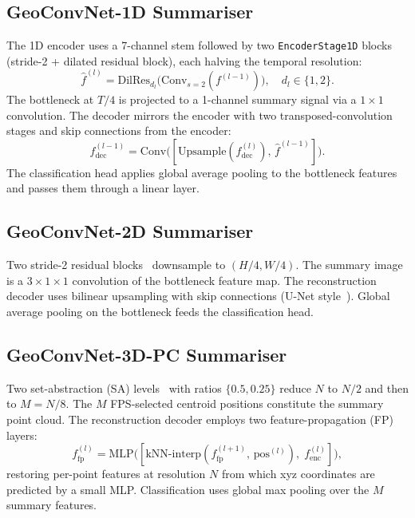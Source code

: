 \documentclass[10pt,conference]{IEEEtran}
\begin{document}
\subsection{GeoConvNet-1D Summariser}

The 1D encoder uses a 7-channel stem followed by two
\texttt{EncoderStage1D} blocks (stride-2 + dilated residual block), each
halving the temporal resolution:
\begin{equation}
  \hat{f}^{(l)} = \mathrm{DilRes}_{d_l}\!\bigl(
    \mathrm{Conv}_{s=2}(f^{(l-1)})\bigr),
  \quad d_l \in \{1, 2\}.
\end{equation}
The bottleneck at $T/4$ is projected to a 1-channel summary signal via a
$1{\times}1$ convolution.  The decoder mirrors the encoder with two
transposed-convolution stages and skip connections from the encoder:
\begin{equation}
  f^{(l-1)}_{\mathrm{dec}}
    = \mathrm{Conv}\!\bigl([\mathrm{Upsample}(f^{(l)}_{\mathrm{dec}}),\,
                             \hat{f}^{(l-1)}]\bigr).
\end{equation}
The classification head applies global average pooling to the bottleneck
features and passes them through a linear layer.

\subsection{GeoConvNet-2D Summariser}

Two stride-2 residual blocks~\cite{he2016deep} downsample to
$(H/4, W/4)$.  The summary image is a $3{\times}1{\times}1$
convolution of the bottleneck feature map.  The reconstruction decoder
uses bilinear upsampling with skip connections (U-Net
style~\cite{ronneberger2015unet}).  Global average pooling on the bottleneck
feeds the classification head.

\subsection{GeoConvNet-3D-PC Summariser}

Two set-abstraction (SA) levels~\cite{qi2017pointnetplusplus} with
ratios $\{0.5, 0.25\}$ reduce $N$ to $N/2$ and then to $M=N/8$.  The
$M$ FPS-selected centroid positions constitute the summary point cloud.
The reconstruction decoder employs two feature-propagation (FP) layers:
\begin{equation}
  f^{(l)}_{\mathrm{fp}} = \mathrm{MLP}\!\bigl(
    [\mathrm{kNN\text{-}interp}(f^{(l+1)}_{\mathrm{fp}},\,
      \mathrm{pos}^{(l)}),\;f^{(l)}_{\mathrm{enc}}]\bigr),
\end{equation}
restoring per-point features at resolution $N$ from which xyz coordinates
are predicted by a small MLP.  Classification uses global max pooling
over the $M$ summary features.
\end{document}
